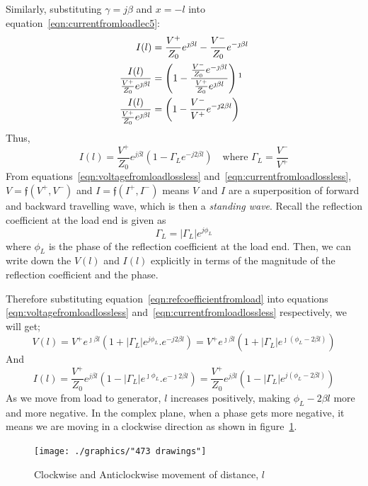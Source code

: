 Similarly, substituting $\gamma = j\beta$ and $x = -l$ into equation~\ref{eqn:currentfromloadlec5}:
\begin{align*}
I(l) &= \frac{V^+}{Z_0} e^{\jmath \beta l} - \frac{V^-}{Z_0} e^{-\jmath\beta l}\\
\frac{I(l)}{\frac{V^+}{Z_0} e^{\jmath\beta l}} &= \left( 1- \frac{\frac{V^-}{Z_0} e^{-\jmath\beta l}}{\frac{V^+}{Z_0} e^{\jmath\beta l}}\right)\footnotemark\\
\frac{I(l)}{\frac{V^+}{Z_0} e^{\jmath\beta l}} &= \left(1- \frac{V^-}{V^+}e^{-\jmath 2 \beta l}\right)
\end{align*}
Thus,
\begin{equation}
I(l) = \frac{V^+}{Z_0}e ^{j \beta l} \left( 1 - \Gamma_L e^{-j 2 \beta l}\right)\quad\text{where }\Gamma _L = \frac{V^-}{V^+}
\label{eqn:currentfromloadlossless}
\end{equation}
From equations~\eqref{eqn:voltagefromloadlossless} and~\eqref{eqn:currentfromloadlossless}, $V = \mathfrak{f}( V^{+}, V^{-})$ and $I = \mathfrak{f}(I^{+}, I^{-})$ means $V$ and $I$ are a superposition of forward and backward travelling wave, which is then a \emph{standing wave}. Recall the reflection coefficient at the load end is given as
\begin{equation}
\Gamma_L = |\Gamma_L|e^{j\phi_L}
\label{eqn:refcoefficientfromload}
\end{equation}
where $\phi_L$ is the phase of the reflection coefficient at the load end. Then, we can write down the $V(l)$ and $I(l)$ explicitly in terms of the magnitude of the reflection coefficient and the phase.

Therefore substituting equation~\ref{eqn:refcoefficientfromload} into equations \ref{eqn:voltagefromloadlossless} and~\ref{eqn:currentfromloadlossless} respectively, we will get;
\begin{dmath}
V(l) = V^{+}e^{\jmath\beta l}(1 + |\Gamma_L|e^{j\phi_L} . e^{-j 2 \beta l})
= V^{+}e^{\jmath\beta l}(1 + |\Gamma_L| e^{\jmath(\phi_L -2 \beta l)})
\end{dmath}
And
\begin{dmath}
I(l) = \frac{V^+}{Z_0}e ^{j \beta l}( 1 - |\Gamma_L|e^{\jmath\phi_L} . e^{-\jmath 2\beta l})
= \frac{V^+}{Z_0}e ^{j \beta l}( 1 -|\Gamma_L| e^{j(\phi_L -2 \beta l)})
\end{dmath}
As we move from load to generator, $l$ increases positively, making $\phi_L -2\beta l$ more and more negative. In the complex plane, when a phase gets more negative, it means we are moving in a clockwise direction as shown in figure~\ref{fig:473-drawings}.
\begin{figure}[h]
\centering
\texttt{[image: ./graphics/"473 drawings"]}
\caption{Clockwise and Anticlockwise movement of distance, $l$}
\label{fig:473-drawings}
\end{figure}

